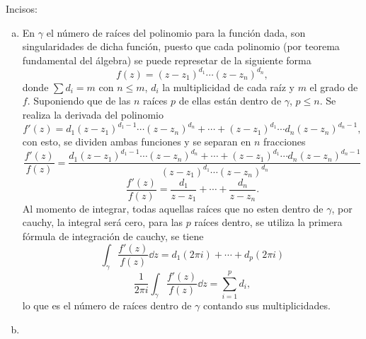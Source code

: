 \begin{mdframed}[style = warning]
	\begin{problem}
		
	\end{problem}
\end{mdframed}



















\begin{mdframed}[style = warning]
	\begin{problem}
		Incisos:
		\begin{enumerate}[a)]
			\item En $\gamma$ el número de raíces del polinomio para la función dada, son singularidades de dicha función, puesto que cada polinomio (por teorema fundamental del álgebra) se puede represetar de la siguiente forma
				$$f(z) = (z - z_1)^{d_1} \cdots (z - z_n)^{d_n},$$
			donde $\sum d_{i} = m$ con $n \leq m$, $d_i$ la multiplicidad de cada raíz y $m$ el grado de $f$. Suponiendo que de las $n$ raíces $p$ de ellas están dentro de $\gamma$, $p\leq n$. Se realiza la derivada del polinomio
				$$f'(z) = d_1 (z - z_1) ^{d_1 - 1} \cdots (z - z_n)^{d_n} + \cdots + (z - z_1)^{d_1} \cdots d_n (z - z_n)^{d_n - 1},$$
			con esto, se dividen ambas funciones y se separan en $n$ fracciones
				$$\frac{f'(z)}{f(z)} = \frac{d_1 (z - z_1) ^{d_1 - 1} \cdots (z - z_n)^{d_n} + \cdots + (z - z_1)^{d_1} \cdots d_n (z - z_n)^{d_n - 1}}{(z - z_1)^{d_1} \cdots (z - z_n)^{d_n}}$$
				$$\frac{f'(z)}{f(z)} = \frac{d_1}{z - z_1} + \cdots + \frac{d_n}{z - z_n}.$$
			Al momento de integrar, todas aquellas raíces que no esten dentro de $\gamma$, por cauchy, la integral será cero, para las $p$ raíces dentro, se utiliza la primera fórmula de integración de cauchy, se tiene
				$$\int _{\gamma} \frac{f'(z)}{f(z)} \dd{z} = d_1 (2\pi i) + \cdots + d_p (2\pi i)$$
				$$\frac{1}{2\pi i} \int _{\gamma} \frac{f'(z)}{f(z)} \dd{z} = \sum _{i = 1} ^p d_i,$$
			lo que es el número de raíces dentro de $\gamma$ contando sus multiplicidades.
			\item 
		\end{enumerate}
	\end{problem}
\end{mdframed}






















